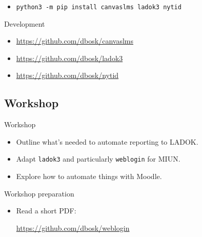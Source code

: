 \begin{frame}[fragile]
  \begin{example}[Installation]
    \begin{itemize}
      \item \texttt{python3 -m pip install canvaslms ladok3 nytid}
    \end{itemize}
  \end{example}

  \pause

  \begin{block}{Development}
    \begin{itemize}
      \item \url{https://github.com/dbosk/canvaslms}
      \item \url{https://github.com/dbosk/ladok3}
      \item \url{https://github.com/dbosk/nytid}
    \end{itemize}
  \end{block}
\end{frame}

\subsection{Workshop}

\begin{frame}
  \begin{block}{Workshop}
    \begin{itemize}
      \item Outline what's needed to automate reporting to LADOK.
      \item Adapt \texttt{ladok3} and particularly \texttt{weblogin} for MIUN.
      \item Explore how to automate things with Moodle.
    \end{itemize}
  \end{block}

  \pause

  \begin{alertblock}{Workshop preparation}
    \begin{itemize}
      \item Read a short PDF:
        \begin{center}
          \href{https://github.com/dbosk/weblogin/releases/download/v1.1/weblogin.pdf}{https://github.com/dbosk/weblogin}
        \end{center}
    \end{itemize}
  \end{alertblock}
\end{frame}

